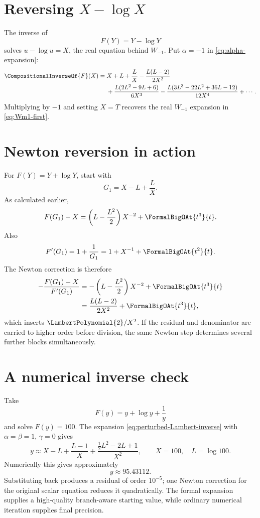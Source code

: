 \documentclass[11pt,openany]{book}
\theoremstyle{definition}
\theoremstyle{plain}
\theoremstyle{remark}
\newcommand{\rev}[1]{\CompositionalInverseOf{#1}}
\begin{document}
\section{Reversing \texorpdfstring{\(X-\log X\)}{X-log X}}
The inverse of
\[
 F(Y)=Y-\log Y
\]
solves \(u-\log u=X\), the real equation behind \(W_{-1}\).  Put
\(\alpha=-1\) in \cref{eq:alpha-expansion}:
\begin{equation}\label{eq:inverse-X-minus-logX}
\begin{split}
 \rev F(X)={}&X+L+\frac{L}{X}
 -\frac{L(L-2)}{2X^2}\\
 &+\frac{L(2L^2-9L+6)}{6X^3}
 -\frac{L(3L^3-22L^2+36L-12)}{12X^4}+\cdots.
\end{split}
\end{equation}
Multiplying by \(-1\) and setting \(X=T\) recovers the real
\(W_{-1}\) expansion in \cref{eq:Wm1-first}.

\section{Newton reversion in action}
For \(F(Y)=Y+\log Y\), start with
\[
 G_1=X-L+\frac{L}{X}.
\]
As calculated earlier,
\[
 F(G_1)-X=\left(L-\frac{L^2}{2}\right)X^{-2}+\FormalBigOAt{t^3}{t}.
\]
Also
\[
 F'(G_1)=1+\frac1{G_1}=1+X^{-1}+\FormalBigOAt{t^2}{t}.
\]
The Newton correction is therefore
\begin{align*}
 -\frac{F(G_1)-X}{F'(G_1)}
 &=-\left(L-\frac{L^2}{2}\right)X^{-2}+\FormalBigOAt{t^3}{t}\\
 &=\frac{L(L-2)}{2X^2}+\FormalBigOAt{t^3}{t},
\end{align*}
which inserts \(\LambertPolynomial{2}/X^2\).  If the residual and denominator are carried to
higher order before division, the same Newton step determines several further
blocks simultaneously.

\section{A numerical inverse check}
Take
\[
 F(y)=y+\log y+\frac{1}{y}
\]
and solve \(F(y)=100\).  The expansion
\cref{eq:perturbed-Lambert-inverse} with \(\alpha=\beta=1\), \(\gamma=0\)
gives
\[
 y\approx X-L+\frac{L-1}{X}
 +\frac{\tfrac12L^2-2L+1}{X^2},
 \qquad X=100,
 \quad L=\log100.
\]
Numerically this gives approximately
\[
 y\approx95.43112.
\]
Substituting back produces a residual of order \(10^{-5}\); one Newton
correction for the original scalar equation reduces it quadratically.  The
formal expansion supplies a high-quality branch-aware starting value, while
ordinary numerical iteration supplies final precision.
\end{document}
